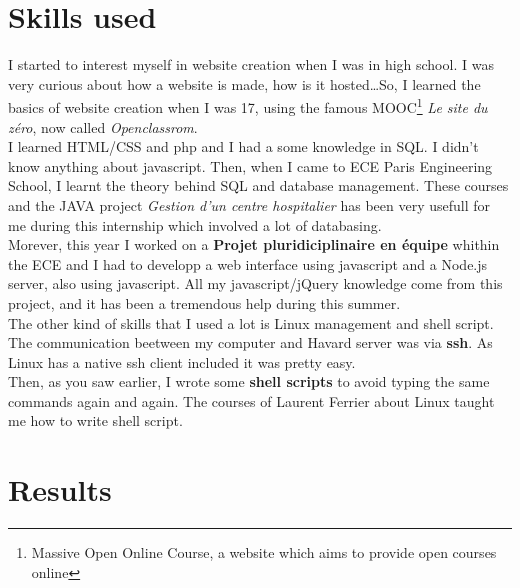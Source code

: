 \documentclass[10pt,a4paper]{article}
\begin{document}
\section{Skills used}

I started to interest myself in website creation when I was in high school. I was very curious about how a website is made, how is it hosted\ldots So, I learned the basics of website creation when I was 17, using the famous MOOC\footnote{Massive Open Online Course, a website which aims to provide open courses online} \textit{Le site du zéro}, now called \textit{Openclassrom}.\\
I learned HTML/CSS and php and I had a some knowledge in SQL. I didn't know anything about javascript.
Then, when I came to ECE Paris Engineering School, I learnt the theory behind SQL and database management. These courses and the JAVA project \textit{Gestion d'un centre hospitalier} has been very usefull for me during this internship which involved a lot of databasing.\\
Morever, this year I worked on a \textbf{Projet pluridiciplinaire en équipe} whithin the ECE and I had to developp a web interface using javascript and a Node.js server, also using javascript. All my javascript/jQuery knowledge come from this project, and it has been a tremendous help during this summer.\\

The other kind of skills that I used a lot is Linux management and shell script.\\
The communication beetween my computer and Havard server was via \textbf{ssh}. As Linux has a native ssh client included it was pretty easy.\\
Then, as you saw earlier, I wrote some \textbf{shell scripts} to avoid typing the same commands again and again. The courses of Laurent Ferrier about Linux taught me how to write shell script.


\section{Results}
\end{document}
